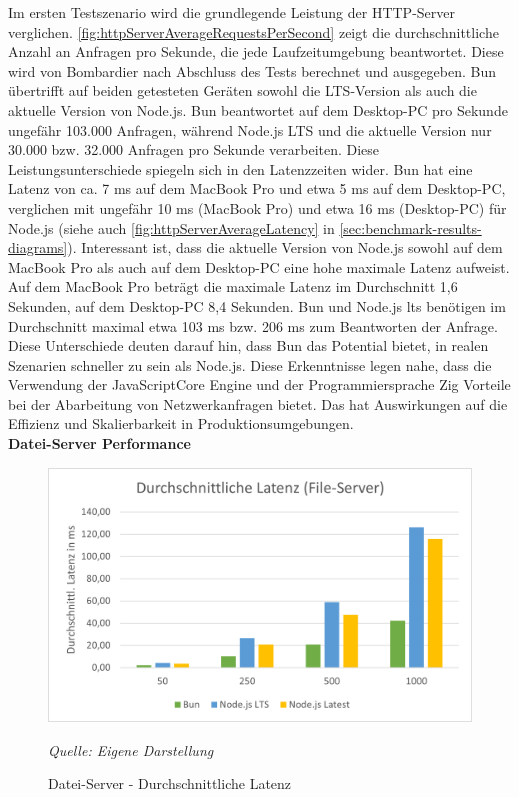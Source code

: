\noindent
Im ersten Testszenario wird die grundlegende Leistung der HTTP-Server verglichen. \autoref{fig:httpServerAverageRequestsPerSecond} zeigt die durchschnittliche Anzahl an Anfragen pro Sekunde, die jede Laufzeitumgebung beantwortet. Diese wird von Bombardier nach Abschluss des Tests berechnet und ausgegeben. Bun übertrifft auf beiden getesteten Geräten sowohl die LTS-Version als auch die aktuelle Version von Node.js. Bun beantwortet auf dem Desktop-PC pro Sekunde ungefähr 103.000 Anfragen, während Node.js LTS und die aktuelle Version nur 30.000 bzw. 32.000 Anfragen pro Sekunde verarbeiten. Diese Leistungsunterschiede spiegeln sich in den Latenzzeiten wider. Bun hat eine Latenz von ca. 7 ms auf dem MacBook Pro und etwa 5 ms auf dem Desktop-PC, verglichen mit ungefähr 10 ms (MacBook Pro) und etwa 16 ms (Desktop-PC) für Node.js (siehe auch \autoref{fig:httpServerAverageLatency} in \autoref{sec:benchmark-results-diagrams}). Interessant ist, dass die aktuelle Version von Node.js sowohl auf dem MacBook Pro als auch auf dem Desktop-PC eine hohe maximale Latenz aufweist. Auf dem MacBook Pro beträgt die maximale Latenz im Durchschnitt 1,6 Sekunden, auf dem Desktop-PC 8,4 Sekunden. Bun und Node.js \ac{lts} benötigen im Durchschnitt maximal etwa 103 ms bzw. 206 ms zum Beantworten der Anfrage.\newline
Diese Unterschiede deuten darauf hin, dass Bun das Potential bietet, in realen Szenarien schneller zu sein als Node.js. Diese Erkenntnisse legen nahe, dass die Verwendung der JavaScriptCore Engine und der Programmiersprache Zig Vorteile bei der Abarbeitung von Netzwerkanfragen bietet. Das hat Auswirkungen auf die Effizienz und Skalierbarkeit in Produktionsumgebungen.\\

\noindent
\textbf{Datei-Server Performance}
\begin{figure}[h!]
	\centering
	\includegraphics[width=\linewidth]{./images/fileServerAverageLatencyDesktop.png}
	\caption{Datei-Server - Durchschnittliche Latenz}
	\label{fig:fileServerAverageLatency}
	\textit{Quelle: Eigene Darstellung}
\end{figure}

